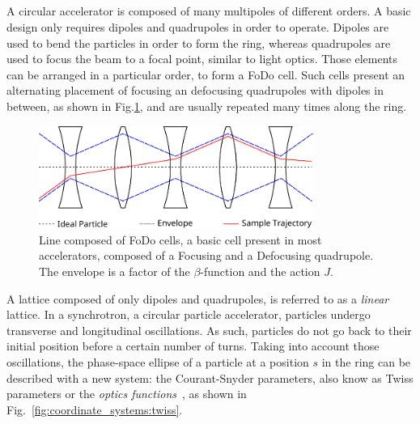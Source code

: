 \subsection{}


\subsubsection{}
\label{section:courant_snyder}

A circular accelerator is composed of many multipoles of different orders. A basic
design only requires dipoles and quadrupoles in order to operate. Dipoles are used to bend the
particles in order to form the ring, whereas quadrupoles are used to focus the beam to a focal
point, similar to light optics.
Those elements can be arranged in a particular order, to form a FoDo cell. Such cells present an
alternating placement of focusing an defocusing quadrupoles with dipoles in between, as shown in
Fig.\ref{fig:coordinate_systems:fodo}, and are usually repeated many times along the ring.

\begin{figure}[htb]
    \centering
    \includegraphics[width=0.8\textwidth]{images/fodo_drawing.pdf}
    \caption{Line composed of FoDo cells, a basic cell present in most accelerators, composed of a
    Focusing and a Defocusing quadrupole. The envelope is a factor of the $\beta$-function and the
    action $J$.}
    \label{fig:coordinate_systems:fodo}
\end{figure}

A lattice composed of only dipoles and quadrupoles, is referred to as a \textit{linear} lattice.
In a synchrotron, a circular particle accelerator, particles undergo transverse and longitudinal 
oscillations. As such, particles do not go back to their initial position before a certain number
of turns. Taking into account those oscillations, the phase-space ellipse of a particle at a 
position $s$ in the ring can be described with a new system: the Courant-Snyder parameters, also
know as Twiss parameters or the \textit{optics functions}~\cite{courant_theory_1958}, as shown in
Fig.~\ref{fig:coordinate_systems:twiss}.\\

